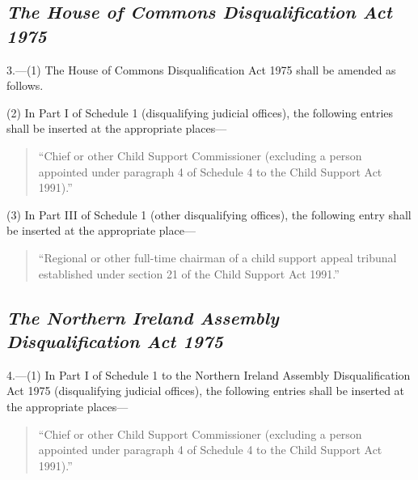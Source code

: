 \documentclass[12pt,a4paper]{article}
\begin{document}
\subsection*{\itshape The House of Commons Disqualification Act 1975}

3.---(1) The House of Commons Disqualification Act 1975 shall be amended as follows.

(2) In Part I 
of Schedule 1  %
(disqualifying judicial offices), the following entries shall be inserted at the appropriate places— 
\begin{quotation}
“Chief or other Child Support Commissioner (excluding a person appointed under paragraph 4 of Schedule 4 to the Child Support Act 1991).''
\end{quotation}

(3) In Part III 
of Schedule 1  %
(other disqualifying offices), the following entry shall be inserted at the appropriate place— 
\begin{quotation}
“Regional or other full-time chairman of a child support appeal tribunal established under section 21 of the Child Support Act 1991.''
\end{quotation}


\subsection*{\itshape The Northern Ireland Assembly Disqualification Act 1975}

4.---(1) In Part I of 
Schedule 1 to  %
the Northern Ireland Assembly Disqualification Act 1975 (disqualifying judicial offices), the following entries shall be inserted at the appropriate places— 
\begin{quotation}
“Chief or other Child Support Commissioner (excluding a person appointed under paragraph 4 of Schedule 4 to the Child Support Act 1991).''
\end{quotation}

\end{document}
